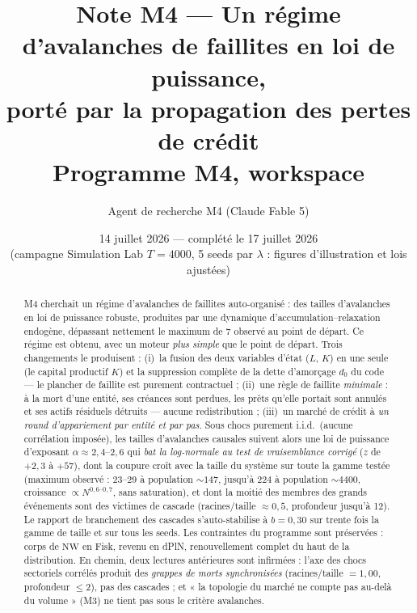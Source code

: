 \documentclass[11pt,a4paper]{article}
\title{Note M4 — Un régime d'avalanches de faillites en loi de puissance,\\
porté par la propagation des pertes de crédit\\
\large Programme M4, workspace \code{m4\_credit\_soc\_fable}}
\author{Agent de recherche M4 (Claude Fable 5)}
\date{14 juillet 2026 --- complété le 17 juillet 2026\\
\small (campagne Simulation Lab $T{=}4000$, 5 seeds par $\lambda$ :
figures d'illustration et lois ajustées)}
\newcommand{\NW}{\mathrm{NW}}
\begin{document}
\maketitle

\begin{abstract}
M4 cherchait un régime d'avalanches de faillites auto-organisé : des tailles
d'avalanches en loi de puissance robuste, produites par une dynamique
d'accumulation--relaxation endogène, dépassant nettement le maximum de 7
observé au point de départ. Ce régime est obtenu, avec un moteur
\emph{plus simple} que le point de départ. Trois changements le produisent :
(i)~la fusion des deux variables d'état ($L$, $K$) en une seule (le capital
productif $K$) et la suppression complète de la dette d'amorçage $d_0$ du
code --- le plancher de faillite est purement contractuel ; (ii)~une règle de
faillite \emph{minimale} : à la mort d'une entité, ses créances sont perdues,
les prêts qu'elle portait sont annulés et ses actifs résiduels détruits ---
aucune redistribution ; (iii)~un marché de crédit à \emph{un round
d'appariement par entité et par pas}. Sous chocs purement i.i.d.\ (aucune
corrélation imposée), les tailles d'avalanches causales suivent alors une loi
de puissance d'exposant $\alpha \approx 2{,}4$--$2{,}6$ qui \emph{bat la
log-normale au test de vraisemblance corrigé} ($z$ de $+2{,}3$ à $+57$), dont
la coupure croît avec la taille du système sur toute la gamme testée
(maximum observé : 23--29 à population ${\sim}147$, jusqu'à 224 à population
${\sim}4400$, croissance $\propto N^{0{,}6\text{--}0{,}7}$, sans saturation),
et dont la moitié des membres des grands événements sont des victimes de
cascade (racines/taille $\approx 0{,}5$, profondeur jusqu'à 12). Le rapport
de branchement des cascades s'auto-stabilise à $b = 0{,}30$ sur trente fois
la gamme de taille et sur tous les seeds. Les contraintes du programme sont
préservées : corps de $\NW$ en Fisk, revenu en dPlN, renouvellement complet
du haut de la distribution. En chemin, deux lectures antérieures sont
infirmées : l'axe des chocs sectoriels corrélés produit des \emph{grappes de
morts synchronisées} (racines/taille $=1{,}00$, profondeur $\le 2$), pas des
cascades ; et « la topologie du marché ne compte pas au-delà du volume »
(M3) ne tient pas sous le critère avalanches.
\end{abstract}
\end{document}
